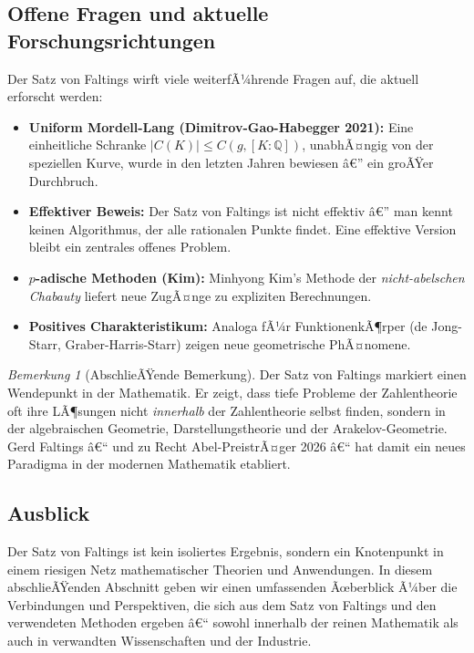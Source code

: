 ﻿\documentclass[12pt,a4paper]{article}
\theoremstyle{plain}
\theoremstyle{definition}
\theoremstyle{remark}
\newtheorem{remark}[theorem]{Bemerkung}
\newcommand{\Q}{\mathbb{Q}}
\begin{document}
\subsection{Offene Fragen und aktuelle Forschungsrichtungen}

Der Satz von Faltings wirft viele weiterfÃ¼hrende Fragen auf, die aktuell erforscht werden:

\begin{itemize}
  \item \textbf{Uniform Mordell-Lang (Dimitrov-Gao-Habegger 2021):}
    Eine einheitliche Schranke $|C(K)| \leq C(g, [K:\Q])$, unabhÃ¤ngig von der speziellen Kurve,
    wurde in den letzten Jahren bewiesen â€” ein groÃŸer Durchbruch.
  \item \textbf{Effektiver Beweis:} Der Satz von Faltings ist nicht effektiv â€” man kennt
    keinen Algorithmus, der alle rationalen Punkte findet. Eine effektive Version
    bleibt ein zentrales offenes Problem.
  \item \textbf{$p$-adische Methoden (Kim):} Minhyong Kim's Methode der
    \emph{nicht-abelschen Chabauty} liefert neue ZugÃ¤nge zu expliziten Berechnungen.
  \item \textbf{Positives Charakteristikum:} Analoga fÃ¼r FunktionenkÃ¶rper
    (de Jong-Starr, Graber-Harris-Starr) zeigen neue geometrische PhÃ¤nomene.
\end{itemize}

\bigskip

\begin{remark}[AbschlieÃŸende Bemerkung]\label{rem:abschluss}
Der Satz von Faltings markiert einen Wendepunkt in der Mathematik.
Er zeigt, dass tiefe Probleme der Zahlentheorie oft ihre LÃ¶sungen
nicht \emph{innerhalb} der Zahlentheorie selbst finden, sondern in der
algebraischen Geometrie, Darstellungstheorie und der Arakelov-Geometrie.
Gerd Faltings â€“ und zu Recht Abel-PreistrÃ¤ger 2026 â€“ hat damit
ein neues Paradigma in der modernen Mathematik etabliert.
\end{remark}

\subsection{Ausblick}

Der Satz von Faltings ist kein isoliertes Ergebnis, sondern ein Knotenpunkt in einem
riesigen Netz mathematischer Theorien und Anwendungen. In diesem abschlieÃŸenden Abschnitt
geben wir einen umfassenden Ãœberblick Ã¼ber die Verbindungen und Perspektiven, die sich
aus dem Satz von Faltings und den verwendeten Methoden ergeben â€“ sowohl innerhalb der
reinen Mathematik als auch in verwandten Wissenschaften und der Industrie.
\end{document}
